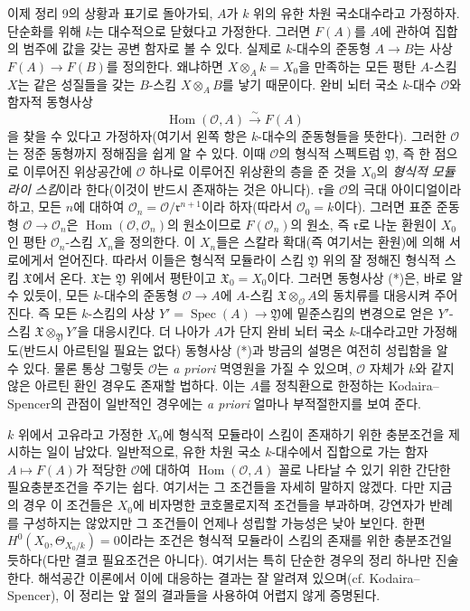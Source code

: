 \documentclass[11pt,twoside,openany]{book}
\numberwithin{equation}{section}
\newcommand{\sourceunit}{front}
\newcommand{\src}[1]{%
  \phantomsection\hypertarget{src:\sourceunit:#1}{}%
  \marginpar{\raggedleft\footnotesize\sffamily #1}%
}
\theoremstyle{plain}
\theoremstyle{definition}
\theoremstyle{remark}
\begin{document}
\src{208}
이제 정리 9의 상황과 표기로 돌아가되, $A$가 $k$ 위의 유한 차원 국소대수라고
가정하자. 단순화를 위해 $k$는 대수적으로 닫혔다고 가정한다. 그러면 $F(A)$를
$A$에 관하여 집합의 범주에 값을 갖는 공변 함자로 볼 수 있다. 실제로
$k$-대수의 준동형 $A\longrightarrow B$는 사상
$F(A)\longrightarrow F(B)$를 정의한다. 왜냐하면
$X\otimes_A k=X_0$을 만족하는 모든 평탄 $A$-스킴 $X$는 같은 성질들을 갖는
$B$-스킴 $X\otimes_A B$를 낳기 때문이다. 완비 뇌터 국소 $k$-대수
$\mathcal O$와 함자적 동형사상
\begin{equation}
  \tag{*}
  \operatorname{Hom}(\mathcal O,A)\xrightarrow{\sim}F(A)
\end{equation}
을 찾을 수 있다고 가정하자(여기서 왼쪽 항은 $k$-대수의 준동형들을 뜻한다).
그러한 $\mathcal O$는 정준 동형까지 정해짐을 쉽게 알 수 있다. 이때
$\mathcal O$의 형식적 스펙트럼 $\mathfrak Y$, 즉 한 점으로 이루어진
위상공간에 $\mathcal O$ 하나로 이루어진 위상환의 층을 준 것을 $X_0$의
\emph{형식적 모듈라이 스킴}이라 한다(이것이 반드시 존재하는 것은 아니다).
$\mathfrak r$을 $\mathcal O$의 극대 아이디얼이라 하고, 모든 $n$에 대하여
$\mathcal O_n=\mathcal O/\mathfrak r^{n+1}$이라 하자(따라서
$\mathcal O_0=k$이다). 그러면 표준 준동형
$\mathcal O\longrightarrow\mathcal O_n$은
$\operatorname{Hom}(\mathcal O,\mathcal O_n)$의 원소이므로
$F(\mathcal O_n)$의 원소, 즉 $\mathfrak r$로 나눈 환원이 $X_0$인 평탄
$\mathcal O_n$-스킴 $X_n$을 정의한다. 이 $X_n$들은 스칼라 확대(즉 여기서는
환원)에 의해 서로에게서 얻어진다. 따라서 이들은 형식적 모듈라이 스킴
$\mathfrak Y$ 위의 잘 정해진 형식적 스킴 $\mathfrak X$에서 온다.
$\mathfrak X$는 $\mathfrak Y$ 위에서 평탄이고 $\mathfrak X_0=X_0$이다.
그러면 동형사상 (*)은, 바로 알 수 있듯이, 모든 $k$-대수의 준동형
$\mathcal O\longrightarrow A$에 $A$-스킴
$\mathfrak X\otimes_{\mathcal O}A$의 동치류를 대응시켜 주어진다. 즉 모든
$k$-스킴의 사상 $Y'=\operatorname{Spec}(A)\longrightarrow\mathfrak Y$에
밑준스킴의 변경으로 얻은 $Y'$-스킴
$\mathfrak X\otimes_{\mathfrak Y}Y'$을 대응시킨다. 더 나아가 $A$가 단지
완비 뇌터 국소 $k$-대수라고만 가정해도(반드시 아르틴일 필요는 없다)
동형사상 (*)과 방금의 설명은 여전히 성립함을 알 수 있다. 물론 통상 그렇듯
$\mathcal O$는 \textit{a priori} 멱영원을 가질 수 있으며,
$\mathcal O$ 자체가 $k$와 같지 않은 아르틴 환인 경우도 존재할 법하다. 이는
$A$를 정칙환으로 한정하는 Kodaira--Spencer의 관점이 일반적인 경우에는
\textit{a priori} 얼마나 부적절한지를 보여 준다.

\src{209}
$k$ 위에서 고유라고 가정한 $X_0$에 형식적 모듈라이 스킴이 존재하기 위한
충분조건을 제시하는 일이 남았다. 일반적으로, 유한 차원 국소 $k$-대수에서
집합으로 가는 함자 $A\longmapsto F(A)$가 적당한 $\mathcal O$에 대하여
$\operatorname{Hom}(\mathcal O,A)$ 꼴로 나타날 수 있기 위한 간단한
필요충분조건을 주기는 쉽다. 여기서는 그 조건들을 자세히 말하지 않겠다.
다만 지금의 경우 이 조건들은 $X_0$에 비자명한 코호몰로지적 조건들을
부과하며, 강연자가 반례를 구성하지는 않았지만 그 조건들이 언제나
성립할 가능성은 낮아 보인다. 한편
$H^0(X_0,\Theta_{X_0/k})=0$이라는 조건은 형식적 모듈라이 스킴의 존재를
위한 충분조건일 듯하다(다만 결코 필요조건은 아니다). 여기서는 특히
단순한 경우의 정리 하나만 진술한다. 해석공간 이론에서 이에 대응하는
결과는 잘 알려져 있으며(cf. Kodaira--Spencer), 이 정리는 앞 절의
결과들을 사용하여 어렵지 않게 증명된다.
\end{document}

